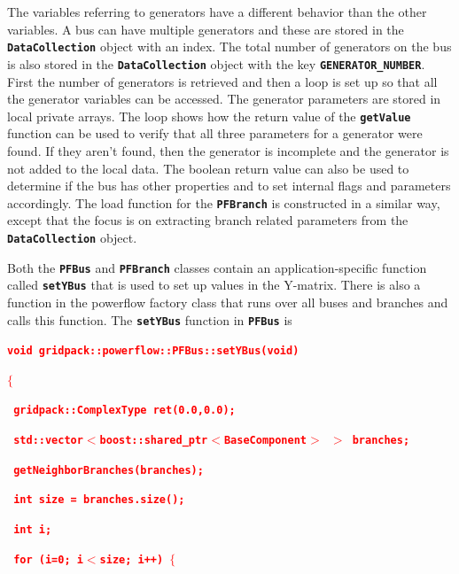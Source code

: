 \documentclass[12pt]{report} %
\begin{document}
The variables referring to generators have a different behavior than the other variables. A bus can have multiple generators and these are stored in the \texttt{\textbf{DataCollection}} object with an index. The total number of generators on the bus is also stored in the \texttt{\textbf{DataCollection}} object with the key \texttt{\textbf{GENERATOR\_NUMBER}}. First the number of generators is retrieved and then a loop is set up so that all the generator variables can be accessed. The generator parameters are stored in local private arrays. The loop shows how the return value of the \texttt{\textbf{getValue}} function can be used to verify that all three parameters for a generator were found. If they aren't found, then the generator is incomplete and the generator is not added to the local data. The boolean return value can also be used to determine if the bus has other properties and to set internal flags and parameters accordingly. The load function for the \texttt{\textbf{PFBranch}} is constructed in a similar way, except that the focus is on extracting branch related parameters from the \texttt{\textbf{DataCollection}} object.

Both the \texttt{\textbf{PFBus}} and \texttt{\textbf{PFBranch}} classes contain an application-specific function called \texttt{\textbf{setYBus}} that is used to set up values in the Y-matrix. There is also a function in the powerflow factory class that runs over all buses and branches and calls this function. The \texttt{\textbf{setYBus}} function in \texttt{\textbf{PFBus}} is

\textcolor{red}{\texttt{\textbf{void gridpack::powerflow::PFBus::setYBus(void)}}}

\textcolor{red}{\texttt{\textbf{$\boldsymbol{\mathrm{\{}}$}}}

\textcolor{red}{\texttt{\textbf{  gridpack::ComplexType ret(0.0,0.0);}}}

\textcolor{red}{\texttt{\textbf{  std::vector$\boldsymbol{\mathrm{<}}$boost::shared\_ptr$\boldsymbol{\mathrm{<}}$BaseComponent$\boldsymbol{\mathrm{>}}$ $\boldsymbol{\mathrm{>}}$ branches;}}}

\textcolor{red}{\texttt{\textbf{  getNeighborBranches(branches);}}}

\textcolor{red}{\texttt{\textbf{  int size = branches.size();}}}

\textcolor{red}{\texttt{\textbf{  int i;}}}

\textcolor{red}{\texttt{\textbf{  for (i=0; i$\boldsymbol{\mathrm{<}}$size; i++) $\boldsymbol{\mathrm{\{}}$}}}
\end{document}
